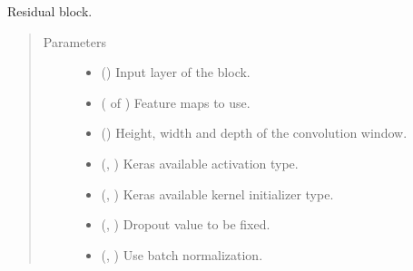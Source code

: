 \documentclass[letterpaper,10pt,english]{sphinxmanual}
\begin{document}
\begin{fulllineitems}
\label{\detokenize{models/resunet_3d:models.resunet_3d.residual_block}}
Residual block.
\begin{quote}\begin{description}
\item[{Parameters}] \leavevmode\begin{itemize}
\item {} 
 () \textendash{} Input layer of the block.

\item {} 
 ( of ) \textendash{} Feature maps to use.

\item {} 
 () \textendash{} Height, width and depth of the convolution window.

\item {} 
 (, ) \textendash{} Keras available activation type.

\item {} 
 (, ) \textendash{} Keras available kernel initializer type.

\item {} 
 (, ) \textendash{} Dropout value to be fixed.

\item {} 
 (, ) \textendash{} Use batch normalization.


\end{itemize}
\end{description}
\end{quote}
\end{fulllineitems}
\end{document}
